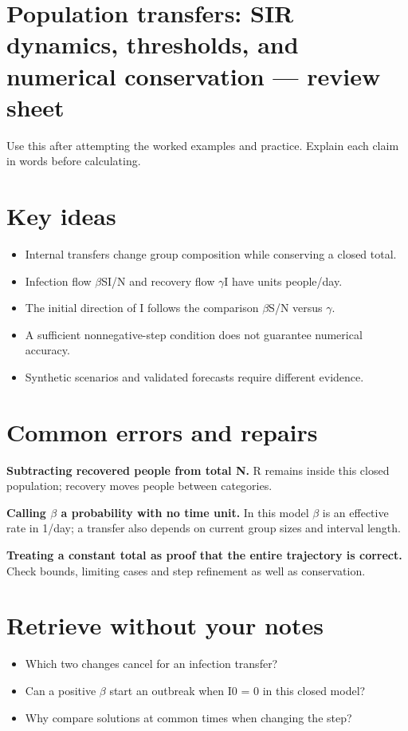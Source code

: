 \documentclass[11pt,letterpaper]{article}
\theoremstyle{definition}\newtheorem{definition}{Definition}\newtheorem{example}{Example}
\numberwithin{equation}{section}
\begin{document}
\section*{Population transfers: SIR dynamics, thresholds, and numerical conservation --- review sheet}
Use this after attempting the worked examples and practice. Explain each claim in words before calculating.

\section*{Key ideas}
\begin{itemize}
\item Internal transfers change group composition while conserving a closed total.
\item Infection flow $\beta$SI/N and recovery flow $\gamma$I have units people/day.
\item The initial direction of I follows the comparison $\beta$S/N versus $\gamma$.
\item A sufficient nonnegative-step condition does not guarantee numerical accuracy.
\item Synthetic scenarios and validated forecasts require different evidence.
\end{itemize}
\section*{Common errors and repairs}
\textbf{Subtracting recovered people from total N.} R remains inside this closed population; recovery moves people between categories.

\textbf{Calling $\beta$ a probability with no time unit.} In this model $\beta$ is an effective rate in 1/day; a transfer also depends on current group sizes and interval length.

\textbf{Treating a constant total as proof that the entire trajectory is correct.} Check bounds, limiting cases and step refinement as well as conservation.

\section*{Retrieve without your notes}
\begin{itemize}
\item Which two changes cancel for an infection transfer?
\item Can a positive $\beta$ start an outbreak when I0 =\allowbreak{} 0 in this closed model?
\item Why compare solutions at common times when changing the step?
\end{itemize}
\end{document}
